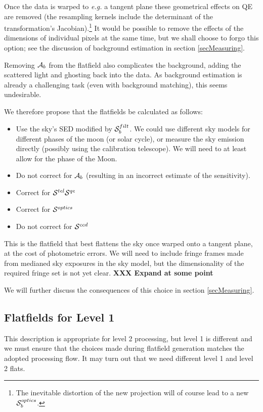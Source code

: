 \documentclass[12pt]{article}
\newcommand{\eg}{\textit{e.g.}\xspace}
\newcommand{\additive}{{\cal A}}
\newcommand{\qe}{{\cal S}}
\newcommand{\XXX}[1]{\textbf{XXX #1}\xspace}
\begin{document}
Once the data is warped to \eg a tangent plane these geometrical effects on QE are removed (the resampling
kernels include the determinant of the transformation's Jacobian).\footnote{ The inevitable distortion of the
  new projection will of course lead to a new $\qe^{optics}_b$.  } It would be possible to remove the effects
of the dimensions of individual pixels at the same time, but we shall choose to forgo this option; see the
discussion of background estimation in section \ref{secMeasuring}.

Removing $\additive_b$ from the flatfield also complicates the background, adding the scattered light and ghosting
back into the data.  As background estimation is already a challenging task (even with background matching),
this seems undesirable.

We therefore propose that the flatfields be calculated as follows:
\begin{itemize}
  \item Use the sky's SED modified by $\qe_b^{filt}$. We could use different sky models for different phases
    of the moon (or solar cycle), or measure the sky emission directly (possibly using the calibration
    telescope). We will need to at least allow for the phase of the Moon.

  \item Do not correct for $\additive_b$ (resulting in an incorrect estimate of the sensitivity).

  \item Correct for $\qe^{tel} \qe^{qe}$

  \item Correct for $\qe^{optics}$

  \item Do not correct for $\qe^{ccd}$
\end{itemize}
This is the flatfield that best flattens the sky once warped onto a tangent plane,
at the cost of photometric errors.
We will need to include fringe frames made from medianed sky exposures in the sky model, but the 
dimensionality of the required fringe set is not yet clear. \XXX{Expand at some point}

We will further discuss the consequences of this choice in section \ref{secMeasuring}.

\subsection{Flatfields for Level 1}

This description is appropriate for level 2 processing, but level 1 is different and we must ensure that the
choices made during flatfield generation matches the adopted processing flow.  It may turn out that we need
different level 1 and level 2 flats.
\end{document}
